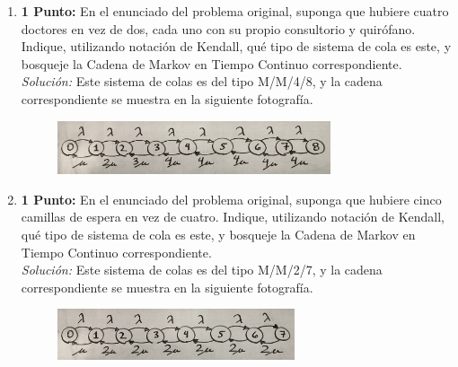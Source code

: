 \documentclass[ a4paper, twoside, 11pt]{article}
\begin{document}
\begin{problem}
\begin{enumerate}[label=\textbf{\alph*)}]
\item \textbf{1 Punto:} En el enunciado del problema original, suponga que hubiere cuatro doctores en vez de dos, cada uno con su propio consultorio y quir\'ofano. Indique, utilizando notaci\'on de Kendall, qu\'e tipo de sistema de cola es este, y bosqueje la Cadena de Markov en Tiempo Continuo correspondiente. \\[1ex]
\emph{Soluci\'on:} Este sistema de colas es del tipo M/M/4/8, y la cadena correspondiente se muestra en la siguiente fotograf\'ia. 
\begin{figure}[htb]
\centering
\includegraphics[width=0.76\textwidth]{Problema-1C.jpg}
\end{figure}

\item \textbf{1 Punto:} En el enunciado del problema original, suponga que hubiere cinco camillas de espera en vez de cuatro. Indique, utilizando notaci\'on de Kendall, qu\'e tipo de sistema de cola es este, y bosqueje la Cadena de Markov en Tiempo Continuo correspondiente. \\[1ex]
\emph{Soluci\'on:} Este sistema de colas es del tipo M/M/2/7, y la cadena correspondiente se muestra en la siguiente fotograf\'ia. 
\begin{figure}[htb]
\centering
\includegraphics[width=0.66\textwidth]{Problema-1D.jpg}
\end{figure}

\end{enumerate}
\QED

\end{problem}
\fullskip
\end{document}
